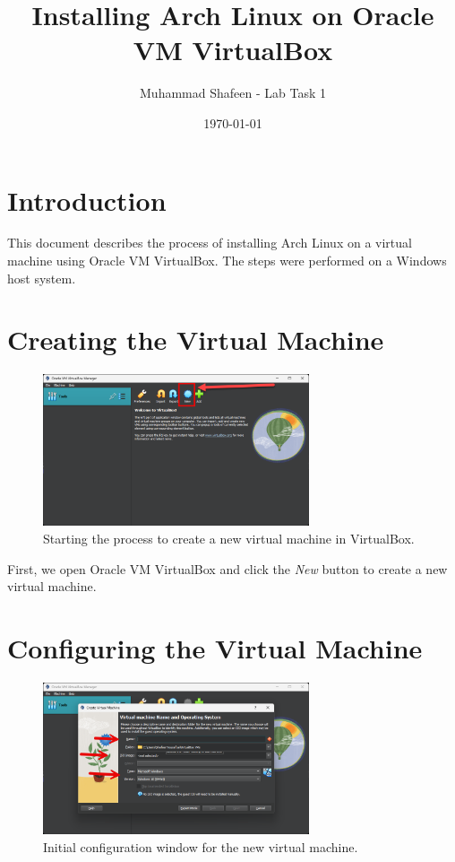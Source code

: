 \documentclass{article}
\title{Installing Arch Linux on Oracle VM VirtualBox}
\author{Muhammad Shafeen - Lab Task 1}
\date{\today}
\begin{document}
\maketitle

\section{Introduction}
This document describes the process of installing Arch Linux on a virtual machine using Oracle VM VirtualBox. The steps were performed on a Windows host system.

\section{Creating the Virtual Machine}
\begin{figure}[H]
    \centering
    \includegraphics[width=0.7\textwidth]{1.png}
    \caption{Starting the process to create a new virtual machine in VirtualBox.}
\end{figure}

First, we open Oracle VM VirtualBox and click the \textit{New} button to create a new virtual machine.

\section{Configuring the Virtual Machine}
\begin{figure}[H]
    \centering
    \includegraphics[width=0.7\textwidth]{2.png}
    \caption{Initial configuration window for the new virtual machine.}
\end{figure}
\end{document}
